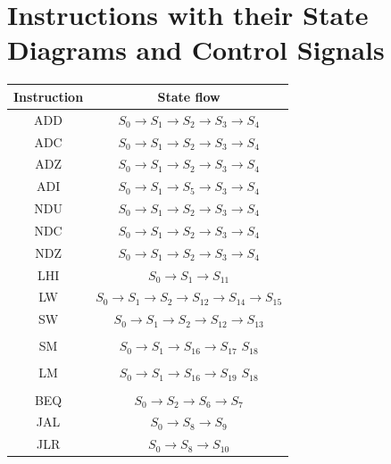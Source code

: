 \documentclass[]{report}
\begin{document}
    \section*{Instructions with their State Diagrams and Control Signals}
        \begin{center}
            \begin{tabular}{|c|c|}
                \hline
                Instruction & State flow\\
                \hline
                ADD & $S_0 \to S_1 \to S_2 \to S_3 \to S_4$\\
                ADC & $S_0 \to S_1 \to S_2 \to S_3 \to S_4$\\
                ADZ & $S_0 \to S_1 \to S_2 \to S_3 \to S_4$\\
                ADI & $S_0 \to S_1 \to S_5 \to S_3 \to S_4$\\
                NDU & $S_0 \to S_1 \to S_2 \to S_3 \to S_4$\\
                NDC & $S_0 \to S_1 \to S_2 \to S_3 \to S_4$\\
                NDZ & $S_0 \to S_1 \to S_2 \to S_3 \to S_4$\\
                LHI & $S_0 \to S_1 \to S_{11}$\\
                LW & $S_0 \to S_1 \to S_2 \to S_{12} \to S_{14} \to S_{15}$\\
                SW & $S_0 \to S_1 \to S_2 \to S_{12} \to S_{13}$\\
                & \\
                SM & $S_0 \to S_1 \to S_{16} \to S_{17} $  $ S_{18}$\\
                & \\
                LM & $S_0 \to S_1 \to S_{16} \to S_{19} $  $ S_{18}$\\
                & \\
                BEQ & $S_0 \to S_2 \to S_6 \to S_7$\\
                JAL & $S_0 \to S_8 \to S_9$\\
                JLR & $S_0 \to S_8 \to S_{10}$\\
                \hline
            \end{tabular}
        \end{center} 
\end{document}
